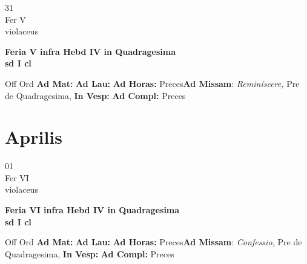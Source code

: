 \documentclass[10pt, openany]{book}
\begin{document}
        \begin{center}
            \begin{minipage}{3.5in}
                \vspace{2em}
                \begin{minipage}{0.5in}
                    {\Huge 31} \\
                    {\normalsize Fer V} \\
                    {\normalsize violaceus}
                \end{minipage}
                \begin{minipage}{3.0in}
                    \textbf{ \large Feria V infra Hebd IV in Quadragesima  \\
                    \textnormal{\normalsize sd I cl}} \\ 
                \end{minipage}
                \begin{justify}Off Ord
                    \textbf{Ad Mat: }
                    \textbf{Ad Lau: }
                    \textbf{Ad Horas: }Preces\textbf{Ad Missam}: \textit{Reminíscere,} Pre de Quadragesima,  
                    \textbf{In Vesp: }
                    \textbf{Ad Compl: }Preces
                \end{justify}
            \end{minipage}
        \end{center}
    
        \chapter{Aprilis}
                        
        \begin{center}
            \begin{minipage}{3.5in}
                \vspace{2em}
                \begin{minipage}{0.5in}
                    {\Huge 01} \\
                    {\normalsize Fer VI} \\
                    {\normalsize violaceus}
                \end{minipage}
                \begin{minipage}{3.0in}
                    \textbf{ \large Feria VI infra Hebd IV in Quadragesima  \\
                    \textnormal{\normalsize sd I cl}} \\ 
                \end{minipage}
                \begin{justify}Off Ord
                    \textbf{Ad Mat: }
                    \textbf{Ad Lau: }
                    \textbf{Ad Horas: }Preces\textbf{Ad Missam}: \textit{Confessio,} Pre de Quadragesima,  
                    \textbf{In Vesp: }
                    \textbf{Ad Compl: }Preces
                \end{justify}
            \end{minipage}
        \end{center}
    
\end{document}
